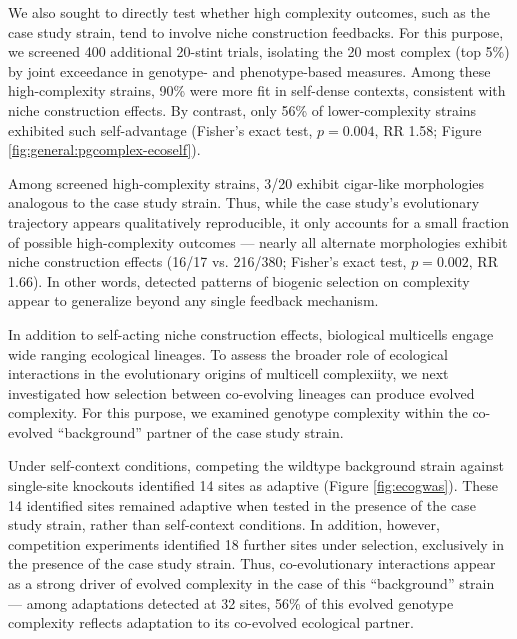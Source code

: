We also sought to directly test whether high complexity outcomes, such as the case study strain, tend to involve niche construction feedbacks.
For this purpose, we screened 400 additional 20-stint trials, isolating the 20 most complex (top 5\%) by joint exceedance in genotype- and phenotype-based measures.
Among these high-complexity strains, 90\% were more fit in self-dense contexts, consistent with niche construction effects.
By contrast, only 56\% of lower-complexity strains exhibited such self-advantage (Fisher's exact test, $p = 0.004$, RR 1.58; Figure \ref{fig:general:pgcomplex-ecoself}).

Among screened high-complexity strains, 3/20 exhibit cigar-like morphologies analogous to the case study strain.
Thus, while the case study's evolutionary trajectory appears qualitatively reproducible, it only accounts for a small fraction of possible high-complexity outcomes --- nearly all alternate morphologies exhibit niche construction effects (16/17 vs. 216/380; Fisher's exact test, $p = 0.002$, RR 1.66).
In other words, detected patterns of biogenic selection on complexity appear to generalize beyond any single feedback mechanism.



In addition to self-acting niche construction effects, biological multicells engage wide ranging ecological lineages.
To assess the broader role of ecological interactions in the evolutionary origins of multicell complexiity, we next investigated how selection between co-evolving lineages can produce evolved complexity.
For this purpose, we examined genotype complexity within the co-evolved ``background'' partner of the case study strain.

Under self-context conditions, competing the wildtype background strain against single-site knockouts identified 14 sites as adaptive (Figure \ref{fig:ecogwas}).
These 14 identified sites remained adaptive when tested in the presence of the case study strain, rather than self-context conditions.
In addition, however, competition experiments identified 18 further sites under selection, exclusively in the presence of the case study strain.
Thus, co-evolutionary interactions appear as a strong driver of evolved complexity in the case of this ``background'' strain --- among adaptations detected at 32 sites, 56\% of this evolved genotype complexity reflects adaptation to its co-evolved ecological partner.
